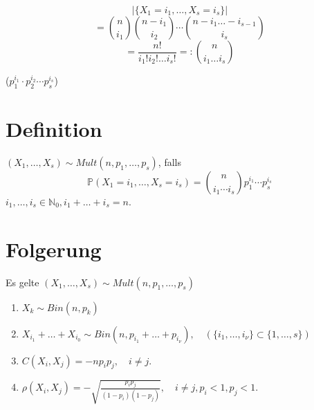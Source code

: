 \documentclass[a4paper,11pt,notitlepage]{report}
\newcommand{\N}{{\ensuremath{\mathbb{N}}}}
\newcommand{\Prim}{{\ensuremath{\mathbb{P}}}}
\begin{document}
$$|\{X_1 = i_1, \ldots, X_s = i_s\}|$$
$$= {n \choose i_1} {n-i_1 \choose i_2} \cdots {n - i_1 \ldots - i_{s-1} \choose i_s}$$
$$= \frac{n!}{i_1! i_2! \ldots i_s!} =: {n \choose i_1 \ldots i_s}$$

($p_1^{i_1} \cdot p_2^{i_2} \cdots p_s^{i_s}$)

\section{Definition}
$(X_1, \ldots, X_s) \sim Mult(n,p_1,\ldots,p_s)$, falls
$$\Prim(X_1 = i_1, \ldots, X_s = i_s) = {n \choose i_1 \cdots i_s} p_1^{i_1} \cdots p_s^{i_s}$$
$i_1, \ldots, i_s \in \N_0, i_1 + \ldots + i_s = n.$

\section{Folgerung}
Es gelte $(X_1, \ldots, X_s) \sim Mult(n, p_1, \ldots, p_s)$
\begin{enumerate}
	\item $X_k \sim Bin(n, p_k)$
	\item $X_{i_1} + \ldots + X_{i_0} \sim Bin(n, p_{i_1} + \ldots + p_{i_\nu}), \quad (\{i_1, \ldots, i_\nu\} \subset \{1, \ldots, s\})$
	\item $C(X_i, X_j) = - n p_i p_j, \quad i \neq j.$
	\item $\rho(X_i, X_j) = - \sqrt{\frac{p_i p_j}{(1-p_i) (1-p_j)}}, \quad i \neq j, p_i < 1, p_j < 1.$
\end{enumerate}
\end{document}
